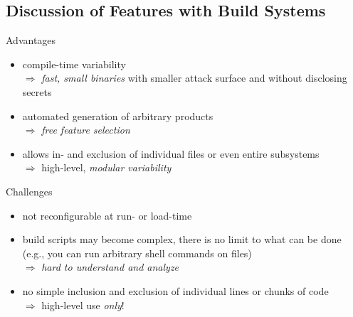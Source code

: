 \subsection[Discussion]{Discussion of Features with Build Systems}
\newcommand{\MajorChallengesOfBuildSystems}{
	\item build scripts may become complex, there is no limit to what can be done (e.g., you can run arbitrary shell commands on files)\\
		$\Rightarrow$ \emph{hard to understand and analyze}
	\item no simple inclusion and exclusion of individual lines or chunks of code\\
	$\Rightarrow$ high-level use \emph{only}!
}
\begin{frame}{\myframetitle}
	\begin{mycolumns}
		\begin{note}{Advantages}
			\begin{itemize}
				\item compile-time variability\\
					$\Rightarrow$ \emph{fast, small binaries} with smaller attack surface and without disclosing secrets
				\item automated generation of arbitrary products\\
					$\Rightarrow$ \emph{free feature selection}
				\item allows in- and exclusion of individual files or even entire subsystems\\
					$\Rightarrow$ high-level, \emph{modular variability}
			\end{itemize}
		\end{note}
	\mynextcolumn
		\begin{note}{Challenges}
			\begin{itemize}
				\item not reconfigurable at run- or load-time %
				\MajorChallengesOfBuildSystems
			\end{itemize}
		\end{note}
	\end{mycolumns}
\end{frame}
